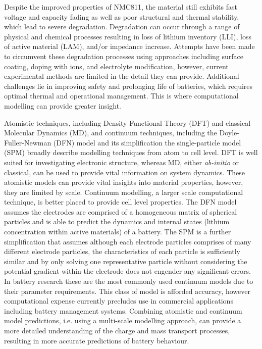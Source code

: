 \documentclass[journal=jacsat,manuscript=article]{achemso}
\begin{document}
Despite the improved properties of NMC811, the material still exhibits fast voltage and capacity fading as well as poor structural and thermal stability\cite{noh2013comparison,Li-aenm-2019,Jerng-ACS-AMI-2020}, which lead to severe degradation. \cite{Zhang-acs.chemmater-2019,Feng-2019,Xia2018,De-AdMat-2019,Li_Nat-Comm-2017,Manthiram-NatComm-2020} Degradation can occur through a range of physical and chemical processes resulting in loss of lithium inventory (LLI), loss of active material (LAM), and/or impedance increase.\cite{vetter2005ageing} Attempts have been made to circumvent these degradation processes using approaches including surface coating, doping with ions, and electrolyte modification,\cite{maleki2019controllable,Liu-JSSE-2020} however, current experimental methods are limited in the detail they can provide. Additional challenges lie in improving safety and prolonging life of batteries, which requires optimal thermal and operational management. This is where computational modelling can provide greater insight.

Atomistic techniques, including Density Functional Theory (DFT) and classical Molecular Dynamics (MD), and continuum techniques, including the Doyle-Fuller-Newman (DFN) model and its simplification the single-particle model (SPM) \cite{Newman1975porous, Doyle1993DFN} broadly describe modelling techniques from atom to cell level. \cite{Howey_2020} DFT is well suited for investigating electronic structure, whereas MD, either \textit{ab-initio} or classical, can be used to provide vital information on system dynamics. These atomistic models can provide vital insights into material properties, however, they are limited by scale. Continuum modelling, a larger scale computational technique, is better placed to provide cell level properties. The DFN model assumes the electrodes are comprised of a homogeneous matrix of spherical particles and is able to predict the dynamics and internal states (lithium concentration within active materials) of a battery. The SPM is a further simplification that assumes although each electrode particles comprises of many different electrode particles, the characteristics of each particle is sufficiently similar and by only solving one representative particle without considering the potential gradient within the electrode does not engender any significant errors. In battery research these are the most commonly used continuum models due to their parameter requirements. This class of model is afforded accuracy, however computational expense currently precludes use in commercial applications including battery management systems. Combining atomistic and continuum model predictions, i.e. using a multi-scale modelling approach, can provide a more detailed understanding of the charge and mass transport processes, resulting in more accurate predictions of battery behaviour.
\end{document}
